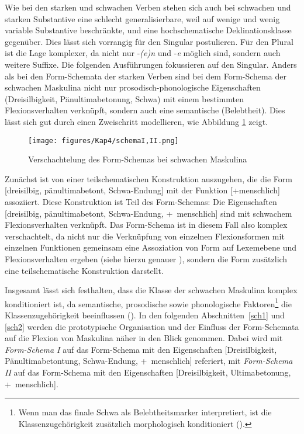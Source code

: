 Wie bei den starken und schwachen Verben stehen sich auch bei schwachen und starken Substantive eine schlecht generalisierbare, weil auf wenige und wenig variable Substantive beschränkte, und eine hochschematische Deklinationsklasse gegenüber. Dies lässt sich vorrangig für den Singular postulieren. Für den Plural ist die Lage komplexer, da nicht nur -\textit{(e)n} und -\textit{e} möglich sind, sondern auch weitere Suffixe. Die folgenden Ausführungen fokussieren auf den Singular. Anders als bei den Form-Schemata der starken Verben sind bei dem Form-Schema der schwachen Maskulina nicht nur prosodisch-phonologische Eigenschaften (Dreisilbigkeit, Pänultimabetonung, Schwa) mit einem bestimmten Flexionsverhalten verknüpft, sondern auch eine semantische (Belebtheit). Dies lässt sich gut durch einen Zweischritt modellieren, wie Abbildung \ref{Schematyp} zeigt. 

\begin{figure}
\texttt{[image: figures/Kap4/schemaI,II.png]}  
\caption{Verschachtelung des Form-Schemas bei schwachen Maskulina}
\label{Schematyp}
\end{figure}

Zunächst ist von einer teilschematischen Konstruktion auszugehen, die die Form [dreisilbig, pänultimabetont, \mbox{Schwa-En}\-dung] mit der Funktion [+menschlich] assoziiert.  Diese Konstruktion ist Teil des Form-Schemas: Die Eigenschaften [dreisilbig, pänultimabetont, Schwa-Endung, +~menschlich] sind mit schwachem Flexionsverhalten verknüpft. Das Form-Schema ist in diesem Fall also komplex verschachtelt, da nicht nur die Verknüpfung von einzelnen Flexionsformen mit einzelnen Funktionen gemeinsam eine Assoziation von Form auf Lexemebene und Flexionsverhalten ergeben (siehe hierzu genauer ), sondern die Form zusätzlich eine teilschematische Konstruktion darstellt. 

Insgesamt lässt sich festhalten, dass die Klasse der schwachen Maskulina komplex konditioniert ist, da semantische, prosodische sowie phonologische Faktoren\footnote{Wenn man das finale Schwa als Belebtheitsmarker interpretiert, ist die Klassenzugehörigkeit zusätzlich morphologisch konditioniert (\cite[172]{Nubling.2016}).} die Klassenzugehörigkeit beeinflussen (\cite[172]{Nubling.2016}). In den folgenden Abschnitten~\ref{sch1} und \ref{sch2} werden die prototypische Organisation und der Einfluss der Form-Schemata auf die Fle\-xion von Maskulina näher in den Blick genommen. Dabei wird mit \textit{Form-Schema I} auf das Form-Schema mit den Eigenschaften [Dreisilbigkeit, Pänultimabetontung, Schwa-Endung, +~menschlich] referiert, mit \textit{Form-Schema II} auf das Form-Schema mit den Eigenschaften [Dreisilbigkeit, Ultimabetonung, +~menschlich].  



